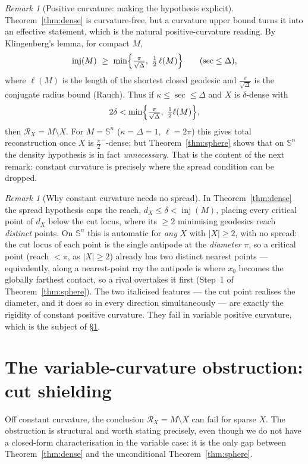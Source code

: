 \documentclass[11pt]{article}
\theoremstyle{remark}
\newtheorem{remark}[theorem]{Remark}
\newcommand{\X}{X}
\newcommand{\Rx}{\mathcal{R}_{\X}}
\newcommand{\inj}{\operatorname{inj}}
\newcommand{\Sn}{\mathbb{S}^{n}}
\begin{document}
\begin{remark}[Positive curvature: making the hypothesis explicit]
\label{rem:explicit}
Theorem~\ref{thm:dense} is curvature-free, but a curvature upper bound
turns it into an effective statement, which is the natural
positive-curvature reading. By Klingenberg's lemma, for compact $M$,
\[
  \inj(M)\ \ge\ \min\Bigl\{\tfrac{\pi}{\sqrt{\Delta}},\ \tfrac12\,
  \ell(M)\Bigr\}\qquad(\sec\le\Delta),
\]
where $\ell(M)$ is the length of the shortest closed geodesic and
$\tfrac{\pi}{\sqrt\Delta}$ is the conjugate radius bound (Rauch). Thus if
$\kappa\le\sec\le\Delta$ and $\X$ is $\delta$-dense with
\[
  2\delta<\min\Bigl\{\tfrac{\pi}{\sqrt\Delta},\ \tfrac12\ell(M)\Bigr\},
\]
then $\Rx=M\setminus\X$. For $M=\Sn$ ($\kappa=\Delta=1$, $\ell=2\pi$) this
gives total reconstruction once $\X$ is $\tfrac\pi2^{-}$-dense; but
Theorem~\ref{thm:sphere} shows that on $\Sn$ the density hypothesis is in
fact \emph{unnecessary}. That is the content of the next remark: constant
curvature is precisely where the spread condition can be dropped.
\end{remark}

\begin{remark}[Why constant curvature needs no spread]\label{rem:why}
In Theorem~\ref{thm:dense} the spread hypothesis caps the reach,
$d_{\X}\le\delta<\inj(M)$, placing every critical point of $d_{\X}$ below
the cut locus, where its $\ge2$ minimising geodesics reach \emph{distinct}
points. On $\Sn$ this is automatic for \emph{any} $\X$ with $|\X|\ge2$, with
no spread: the cut locus of each point is the single antipode at the
\emph{diameter} $\pi$, so a critical point (reach $<\pi$, as $|\X|\ge2$)
already has two distinct nearest points --- equivalently, along a
nearest-point ray the antipode is where $x_{0}$ becomes the globally
farthest contact, so a rival overtakes it first (Step~1 of
Theorem~\ref{thm:sphere}). The two italicised features ---
the cut point realises the diameter, and it does so in every direction
simultaneously --- are exactly the rigidity of constant positive
curvature. They fail in variable positive curvature, which is the subject
of \S\ref{sec:variable}.
\end{remark}

\section{The variable-curvature obstruction: cut shielding}
\label{sec:variable}

Off constant curvature, the conclusion $\Rx=M\setminus\X$ can fail for
sparse $\X$. The obstruction is structural and worth stating precisely,
even though we do not have a closed-form characterisation in the variable
case: it is the only gap between Theorem~\ref{thm:dense} and the
unconditional Theorem~\ref{thm:sphere}.
\end{document}
